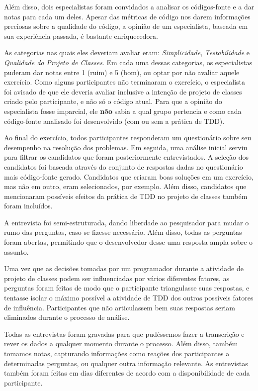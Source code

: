 \documentclass[conference]{IEEEtran}
\begin{document}
Além disso, dois especialistas foram convidados a analisar os códigos-fonte e a dar notas para cada
um deles. Apesar das métricas de código nos darem informações
preciosas sobre a qualidade do código, a opinião de um especialista, baseada
em sua experiência passada, é bastante enriquecedora.

As categorias nas quais eles deveriam avaliar eram: \textit{Simplicidade}, \textit{Testabilidade} e
\textit{Qualidade do Projeto de Classes}.
Em cada uma dessas categorias, os especialistas puderam dar notas entre
1 (ruim) e 5 (bom), ou optar por não avaliar aquele exercício.
Como alguns participantes não terminaram o exercício, o especialista
foi avisado de que ele deveria avaliar inclusive a intenção de projeto de classes criado
pelo participante, e não só o código atual. 
Para que a opinião do especialista fosse imparcial, ele \textbf{não} sabia a qual grupo
pertencia e como cada código-fonte analisado foi desenvolvido (com ou sem a prática de TDD).

Ao final do exercício, todos participantes
responderam um questionário sobre seu desempenho na resolução dos problemas.
Em seguida, uma análise inicial serviu para filtrar os candidatos
que foram posteriormente entrevistados. A seleção dos candidatos foi baseada
através do conjunto de respostas dadas no questionário mais código-fonte gerado. Candidatos
que criaram boas soluções em um exercício, mas não em outro, eram selecionados, por exemplo.
Além disso, candidatos que mencionaram possíveis efeitos da prática de TDD no projeto de classes
também foram incluídos.

A entrevista foi semi-estruturada, dando liberdade ao
pesquisador para mudar o rumo das perguntas, caso se fizesse necessário.
Além disso, todas as perguntas foram abertas, permitindo que o desenvolvedor desse
uma resposta ampla sobre o assunto.

Uma vez que as decisões tomadas por um programador durante a atividade de projeto de classes
podem ser influenciadas por vários diferentes fatores, 
as perguntas foram feitas de modo que o participante triangulasse suas respostas,
e tentasse isolar o máximo possível a atividade de TDD dos outros possíveis fatores
de influência. Participantes que não articulassem bem suas respostas seriam eliminados
durante o processo de análise.

Todas as entrevistas foram gravadas para que pudéssemos fazer a
transcrição e rever os dados a qualquer momento durante o processo. Além disso,
também tomamos notas, capturando informações como reações dos 
participantes a determinadas perguntas, ou qualquer outra informação relevante. 
As entrevistas também foram feitas em dias diferentes de acordo com a disponibilidade
de cada participante.
\end{document}
